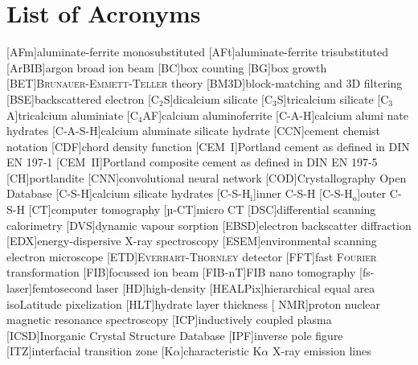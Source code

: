 \chapter{List of Acronyms}

\begin{acronym}[LA-ICP-MS]\itemsep=0pt
	[AFm]{aluminate-ferrite monosubstituted}
	[AFt]{aluminate-ferrite trisubstituted}
	[ArBIB]{argon broad ion beam}
	[BC]{box counting}
	[BG]{box growth}
	[BET]{B\textsc{runauer}-\textsc{Emmett}-\textsc{Teller} theory}%
	[BM3D]{block-matching and 3D filtering}
	[BSE]{backscattered electron}
	[C$_2$S]{dicalcium silicate}
	[C$_3$S]{tricalcium silicate}
	[C$_3$A]{tricalcium aluminiate}
	[C$_4$AF]{calcium aluminoferrite}
	[C\hbox{-}A\hbox{-}H\xspace]{calcium alumi nate hydrates}
	[C\hbox{-}A\hbox{-}S\hbox{-}H]{calcium aluminate silicate hydrate} 
	[CCN]{cement chemist notation}
	[CDF]{chord density function} 
	[CEM~I]{Portland cement as defined in DIN EN 197-1} 
	[CEM~II]{Portland composite cement as defined in DIN EN 197-5} 
	[CH]{portlandite}
	[CNN]{convolutional neural network}
	[COD]{Crystallography Open Database}
	[C\hbox{-}S\hbox{-}H\xspace]{calcium silicate hydrates}
	[C-S-H$_\text{i}$]{inner C\hbox{-}S\hbox{-}H}
	[C-S-H$_\text{o}$]{outer C\hbox{-}S\hbox{-}H}
	[CT]{computer tomography}
	[µ-CT]{micro CT}
	[DSC]{differential scanning calorimetry}
	[DVS]{dynamic vapour sorption}
	[EBSD]{electron backscatter diffraction}
	[EDX]{energy-dispersive X-ray spectroscopy}
	[ESEM]{environmental scanning electron microscope}
	[ETD]{E\textsc{verhart}-\textsc{Thornley} detector}
	[FFT]{fast \textsc{Fourier} transformation}
	[FIB]{focussed ion beam}
	[FIB-nT]{FIB nano tomography}
	[fs-laser]{femtosecond laser}
	[HD]{high-density}
	[HEALPix]{hierarchical equal area isoLatitude pixelization}
	[HLT]{hydrate layer thickness}
	[ NMR]{proton nuclear magnetic resonance spectroscopy}
	[ICP]{inductively coupled plasma}
	[ICSD]{Inorganic Crystal Structure Database}
	[IPF]{inverse pole figure}
	[ITZ]{interfacial transition zone}
	[K$\alpha$]{characteristic K$\alpha$ X-ray emission lines}

\end{acronym}
